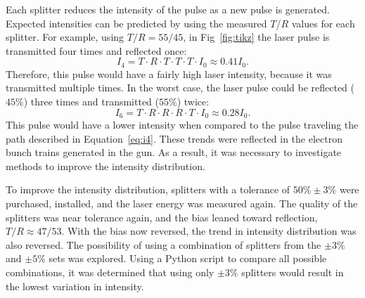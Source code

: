 Each splitter reduces the intensity of the pulse as a new pulse is generated. Expected intensities
can be predicted by using the measured $T$/$R$ values for each splitter. For example, using $T/R=55/45$,
in Fig~\ref{fig:tikz} the laser pulse is transmitted four times and reflected once: 
\begin{equation}\label{eq:i4}
I_4 =  T \cdot R \cdot T \cdot T \cdot T \cdot I_0 \approx 0.41 I_0.
\end{equation}
Therefore, this pulse would have a fairly high laser intensity, because it was transmitted multiple times. 
In the worst case, the laser pulse could be reflected ($45\%$) three times and transmitted ($55\%$) twice: 
\begin{equation}\label{eq:i6}
I_6 =  T \cdot R \cdot R \cdot R \cdot T \cdot  I_0 \approx 0.28 I_0.
\end{equation}
This pulse would have a lower intensity when compared to the pulse traveling the path described in Equation~\ref{eq:i4}.
These trends were reflected in the electron bunch trains generated in the gun.
As a result, it was necessary to investigate methods to improve the intensity distribution. 

To improve the intensity distribution, splitters with a tolerance of $50\%\pm3\%$ were purchased, 
installed, and the laser energy was measured again. The quality of the splitters was near tolerance 
again, and the bias leaned toward reflection, $T/R \approx 47/53$. With the bias now reversed, 
the trend in intensity distribution was also reversed. The possibility of using a combination 
of splitters from the $\pm3\%$ and $\pm5\%$ sets was explored. 
Using a Python script to compare all possible combinations, it was determined that using only 
$\pm3\%$ splitters would result in the lowest variation in intensity. 

